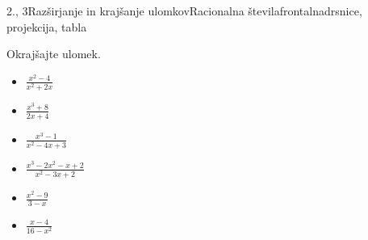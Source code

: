 \begin{priprava}{2., 3}{}{Razširjanje in krajšanje ulomkov}{Racionalna števila}{frontalna}{drsnice, projekcija, tabla}
\begin{multicols}{2}
        
            \begin{naloga}
                Okrajšajte ulomek.
                \begin{itemize}
                            \item $\frac{x^2-4}{x^2+2x}$ 
                            \item $\frac{x^3+8}{2x+4}$ 
                            \item $\frac{x^3-1}{x^2-4x+3}$ 
                            \item $\frac{x^3-2x^2-x+2}{x^2-3x+2}$ 
                            \item $\frac{x^2-9}{3-x}$ 
                            \item $\frac{x-4}{16-x^2}$ 
                \end{itemize}
            \end{naloga}
        
            ~\\~\\
        \end{multicols}

\end{priprava}